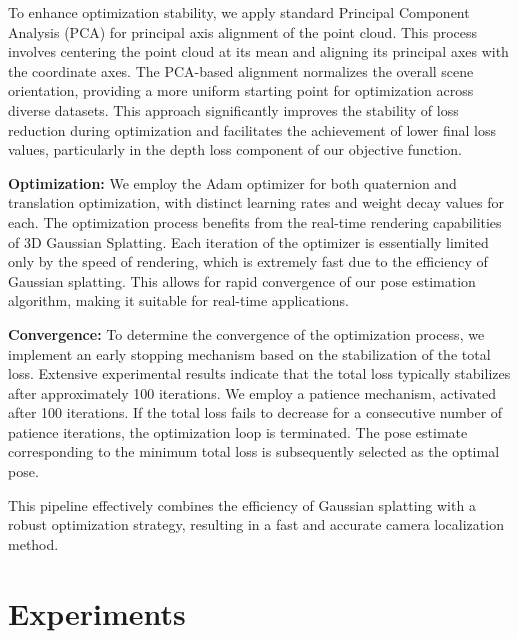 \documentclass[twocolumn]{article} %
\begin{document}
To enhance optimization stability, we apply standard Principal Component
Analysis (PCA) for principal axis alignment of the point cloud. This
process involves centering the point cloud at its mean and aligning its
principal axes with the coordinate axes. The PCA-based alignment
normalizes the overall scene orientation, providing a more uniform
starting point for optimization across diverse datasets. This approach
significantly improves the stability of loss reduction during
optimization and facilitates the achievement of lower final loss values,
particularly in the depth loss component of our objective function.

\textbf{Optimization:} We employ the Adam optimizer for both quaternion
and translation optimization, with distinct learning rates and weight
decay values for each. The optimization process benefits from the
real-time rendering capabilities of 3D Gaussian Splatting. Each
iteration of the optimizer is essentially limited only by the speed of
rendering, which is extremely fast due to the efficiency of Gaussian
splatting. This allows for rapid convergence of our pose estimation
algorithm, making it suitable for real-time applications.

\textbf{Convergence:} To determine the convergence of the optimization
process, we implement an early stopping mechanism based on the
stabilization of the total loss. Extensive experimental results indicate
that the total loss typically stabilizes after approximately 100
iterations. We employ a patience mechanism, activated after 100
iterations. If the total loss fails to decrease for a consecutive number
of patience iterations, the optimization loop is terminated. The pose
estimate corresponding to the minimum total loss is subsequently
selected as the optimal pose.

This pipeline effectively combines the efficiency of Gaussian splatting
with a robust optimization strategy, resulting in a fast and accurate
camera localization method.

\section{Experiments}\label{experiments}
\end{document}
